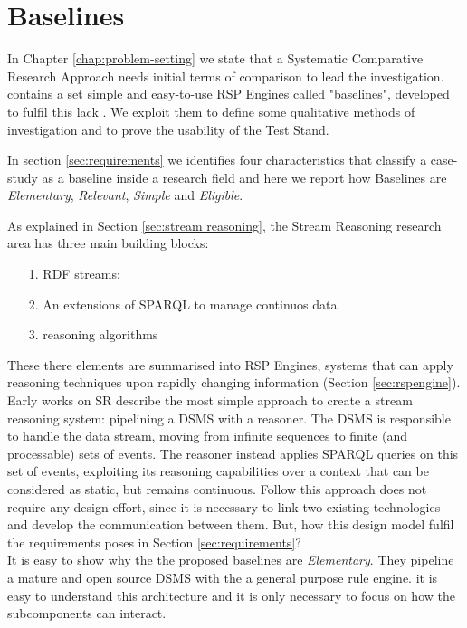 \section{Baselines}
\label{sec:baselines}

\noindent In Chapter \ref{chap:problem-setting} we state that a Systematic Comparative Research Approach needs initial terms of comparison to lead the investigation. \name contains a set simple and easy-to-use RSP Engines called "baselines", developed to fulfil this lack . 
We exploit them to define some qualitative methods of investigation and to prove the usability of the Test Stand. 

In section \ref{sec:requirements} we identifies four characteristics that classify a case-study as a baseline inside a research field and here we report how \name Baselines are \textit{Elementary}, \textit{Relevant}, \textit{Simple} and \textit{Eligible}.

As explained in Section \ref{sec:stream reasoning}, the Stream Reasoning research area has three main building blocks: \begin{enumerate}
\item[1.] RDF streams;
\item[2.] An extensions of SPARQL to manage continuos data
\item[3.] reasoning algorithms
\end{enumerate}
These there elements are summarised into RSP Engines, systems that can apply reasoning techniques upon rapidly changing information (Section \ref{sec:rspengine}). Early works on SR \cite{DBLP:conf/fis/ValleCBBC08,Walavalkar08streamingknowledge} describe the most simple approach to create a stream reasoning system: pipelining a DSMS with a reasoner. The DSMS is responsible to handle the data stream, moving from infinite sequences to finite (and processable) sets of events. The reasoner instead applies SPARQL queries on this set of events, exploiting its reasoning capabilities over a context that can be considered as static, but remains continuous. Follow this approach does not require any design effort, since it is necessary to link two existing technologies and develop the communication between them. But, how this design model fulfil the requirements poses in Section \ref{sec:requirements}?\\

It is easy to show why the the proposed baselines are \textit{Elementary}. They pipeline a mature and open source DSMS with the a general purpose rule engine. it is easy to understand this architecture and it is only necessary to focus on how the subcomponents can interact.

